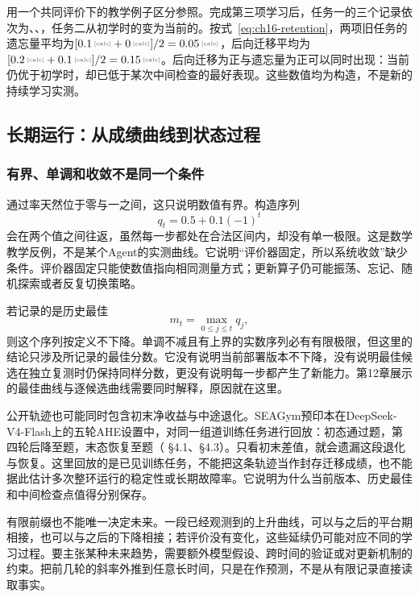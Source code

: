 用一个共同评价下的教学例子区分参照。完成第三项学习后，任务一的三个记录依次为、、，任务二从初学时的变为当前的。按式~\eqref{eq:ch16-retention}，两项旧任务的遗忘量平均为$[\calcnum{0.1}+\calcnum{0}]/2=\calcnum{0.05}$，后向迁移平均为$[\calcnum{0.2}+\calcnum{0.1}]/2=\calcnum{0.15}$。后向迁移为正与遗忘量为正可以同时出现：当前仍优于初学时，却已低于某次中间检查的最好表现。这些数值均为构造，不是新的持续学习实测。

\subsection{长期运行：从成绩曲线到状态过程}
\label{sec:ch16-longrun}

\subsubsection{有界、单调和收敛不是同一个条件}

通过率天然位于零与一之间，这只说明数值有界。构造序列
\[
 q_t=0.5+0.1(-1)^t
\]
会在两个值之间往返，虽然每一步都处在合法区间内，却没有单一极限。这是数学教学反例，不是某个Agent的实测曲线。它说明“评价器固定，所以系统收敛”缺少条件。评价器固定只能使数值指向相同测量方式；更新算子仍可能振荡、忘记、随机探索或者反复切换策略。

若记录的是历史最佳
\[
 m_t=\max_{0\leq j\leq t} q_j,
\]
则这个序列按定义不下降。单调不减且有上界的实数序列必有有限极限，但这里的结论只涉及所记录的最佳分数。它没有说明当前部署版本不下降，没有说明最佳候选在独立复测时仍保持同样分数，更没有说明每一步都产生了新能力。第12章展示的最佳曲线与逐候选曲线需要同时解释，原因就在这里。

公开轨迹也可能同时包含初末净收益与中途退化。SEAGym预印本在DeepSeek-V4-Flash上的五轮AHE设置中，对同一组道训练任务进行回放：初态通过题，第四轮后降至题，末态恢复至题（\cite{seagym-2606} §4.1、§4.3）。只看初末差值，就会遗漏这段退化与恢复。这里回放的是已见训练任务，不能把这条轨迹当作封存迁移成绩，也不能据此估计多次整环运行的稳定性或长期故障率。它说明为什么当前版本、历史最佳和中间检查点值得分别保存。

有限前缀也不能唯一决定未来。一段已经观测到的上升曲线，可以与之后的平台期相接，也可以与之后的下降相接；若评价没有变化，这些延续仍可能对应不同的学习过程。要主张某种未来趋势，需要额外模型假设、跨时间的验证或对更新机制的约束。把前几轮的斜率外推到任意长时间，只是在作预测，不是从有限记录直接读取事实。

